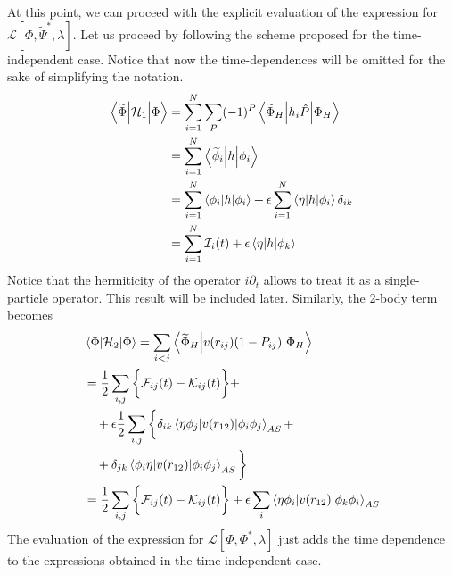 At this point, we can proceed with the explicit evaluation of the expression for $\mathcal{L}[\Phi, \widetilde\Psi ^*, \lambda]$. Let us proceed by following the scheme proposed for the time-independent case. Notice that now the time-dependences will be omitted for the sake of simplifying the notation.
\begin{align*}
    \bracketOP{\widetilde\Phi}{\Phi}{\mathcal{H}_1} 
    &= \sum_{i=1}^N \sum_P (-1)^P \bracketOP{\widetilde\Phi_H}{\Phi_H}{h_i\hat{P}} \\
    &= \sum_{i=1}^N \bracketOP{\widetilde\phi_i}{\phi_i}{h} \\
    &= \sum_{i=1}^N \bracketOP{\phi_i}{\phi_i}{h} + \epsilon \sum_{i=1}^N \bracketOP{\eta}{\phi_i}{h} \delta_{ik} \\
    &= \sum_{i=1}^N \mathcal{I}_i(t) + \epsilon \bracketOP{\eta}{\phi_k}{h} 
\end{align*}
Notice that the hermiticity of the operator $i\partial_t$ allows to treat it as a single-particle operator. This result will be included later. Similarly, the 2-body term becomes
\begin{align*}
    &\bracketOP{\Phi}{\Phi}{\mathcal{H}_2}
    = \sum_{i<j} \bracketOP{\widetilde\Phi_H}{\Phi_H}{v(r_{ij})(1-P_{ij})} \\
    &= \frac{1}{2} \sum_{i,j} \bigg\{ \mathcal{F}_{ij}(t) - \mathcal{K}_{ij}(t) \bigg\} + \\
    &\quad +\epsilon \frac{1}{2} \sum_{i,j} \bigg\{ \delta_{ik} \bracketOP{\eta \phi_j}{\phi_i \phi_j }{v(r_{12})}_{AS} + \\
    & \quad + \delta_{jk} \bracketOP{\phi_i \eta}{\phi_i \phi_j }{v(r_{12})}_{AS} \bigg\} \\ 
    &= \frac{1}{2} \sum_{i,j} \bigg\{ \mathcal{F}_{ij}(t) - \mathcal{K}_{ij}(t) \bigg\} + \epsilon \sum_{i} \bracketOP{\eta \phi_i}{\phi_k \phi_i }{v(r_{12})}_{AS}
\end{align*}
The evaluation of the expression for $\mathcal{L}[\Phi, \Phi^*, \lambda]$ just adds the time dependence to the expressions obtained in the time-independent case.\\

